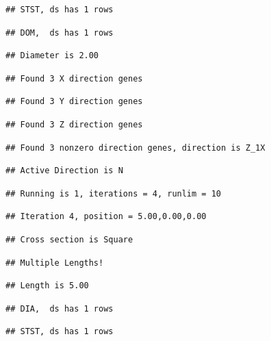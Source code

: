 \documentclass[]{article}
\begin{document}
\begin{verbatim}
## STST, ds has 1 rows
\end{verbatim}

\begin{verbatim}
## DOM,  ds has 1 rows
\end{verbatim}

\begin{verbatim}
## Diameter is 2.00
\end{verbatim}

\begin{verbatim}
## Found 3 X direction genes
\end{verbatim}

\begin{verbatim}
## Found 3 Y direction genes
\end{verbatim}

\begin{verbatim}
## Found 3 Z direction genes
\end{verbatim}

\begin{verbatim}
## Found 3 nonzero direction genes, direction is Z_1X
\end{verbatim}

\begin{verbatim}
## Active Direction is N
\end{verbatim}

\begin{verbatim}
## Running is 1, iterations = 4, runlim = 10
\end{verbatim}

\begin{verbatim}
## Iteration 4, position = 5.00,0.00,0.00
\end{verbatim}

\begin{verbatim}
## Cross section is Square
\end{verbatim}

\begin{verbatim}
## Multiple Lengths!
\end{verbatim}

\begin{verbatim}
## Length is 5.00
\end{verbatim}

\begin{verbatim}
## DIA,  ds has 1 rows
\end{verbatim}

\begin{verbatim}
## STST, ds has 1 rows
\end{verbatim}
\end{document}
